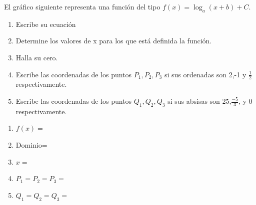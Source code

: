 \documentclass[12pt, addpoints, answers]{exam}
\begin{document}
\begin{questions}
\begin{minipage}[t]{0.48\linewidth}
	\shorthandon{>}
\end{minipage}
\question[1]El gráfico siguiente representa una función del tipo $f(x)=\log_a(x+b)+C$.
\begin{enumerate}
	\item Escribe su ecuación
	\item Determine los valores de x para los que está definida la función.
	\item Halla su cero.
	\item Escribe las coordenadas de los puntos $P_{1},P_{2},P_{3}$ si sus ordenadas son 2,-1 y $\frac{1}{2}$ respectivamente.
	\item Escribe las coordenadas de los puntos $Q_{1},Q_{2},Q_{3}$ si sus absisas son 25,$\frac{-5}{3}$, y 0 respectivamente.
	\end{enumerate}
\begin{solution}
	\begin{enumerate}
		\item $f(x)=$ %
		\item Dominio= %
		\item $x=$ %
		\item $P_{1}=$\hspace{1in}$P_{2}=$\hspace{1in}$P_{3}=$ %
		\item $Q_{1}=$\hspace{1in}$Q_{2}=$\hspace{1in}$Q_{3}=$ %
	\end{enumerate}
\end{solution}


\end{questions}
\end{document}
